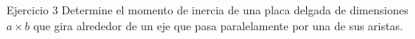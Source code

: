\begin{frame}{Ejercicio 3}
    Determine el momento de inercia de una placa delgada de dimensiones $a\times b$ que gira alrededor de un eje que pasa paralelamente por una de sus aristas.
\end{frame}



